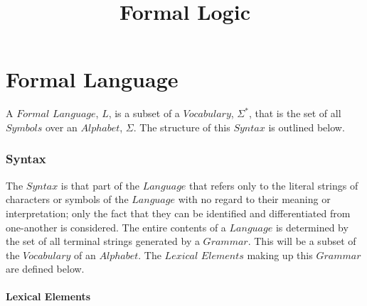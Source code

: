 \documentclass{article}
\begin{document}

\title{Formal Logic}
\date{}
\maketitle


\tableofcontents


\part{Formal Language}

A $Formal$ $Language$, $L$, is a subset of a $Vocabulary$, $\Sigma^*$,
that is the set of all $Symbols$ over an $Alphabet$, $\Sigma$. The
structure of this $Syntax$ is outlined below.

\section{Syntax}

The $Syntax$ is that part of the $Language$ that refers only to the
literal strings of characters or symbols of the $Language$ with no
regard to their meaning or interpretation; only the fact that they can
be identified and differentiated from one-another is considered. The
entire contents of a $Language$ is determined by the set of all
terminal strings generated by a $Grammar$. This will be a subset of
the $Vocabulary$ of an $Alphabet$. The $Lexical$ $Elements$
making up this $Grammar$ are defined below.

    \subsection{Lexical Elements}
\end{document}
